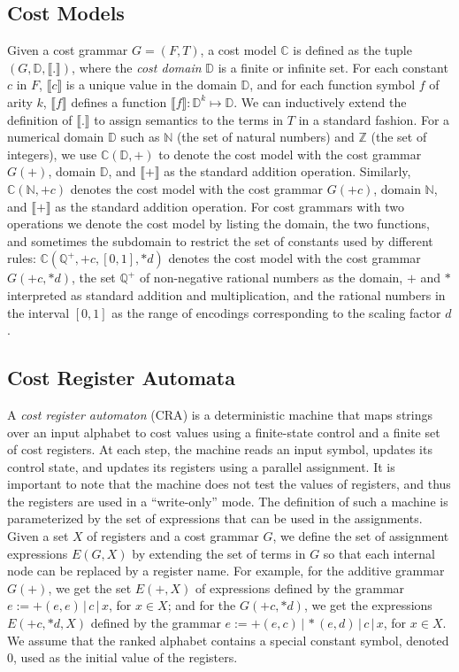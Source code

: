 \documentclass[11pt]{article}
\newcommand{\mypar}[1]{\subsection{#1}}
\newcommand{\domain}{\ensuremath{\mathbb{D}}}
\newcommand{\posrat}{\ensuremath{\mathbb{Q}^+}}
\newcommand{\Nat}{\ensuremath{\mathbb{N}}}
\newcommand{\vocab}{F}
\newcommand{\trees}{T}
\newcommand{\CG}{G}
\newcommand{\sep}{\ensuremath{\,|\,}}
\newcommand{\CostModel}{\ensuremath{\mathbb{C}}}
\newcommand{\interp}[1]{\ensuremath{\llbracket #1\rrbracket}}
\newcommand{\EDWA}{{CRA}\xspace}
\newcommand{\edwaexpr}[1]{\ensuremath{E(#1)}}
\begin{document}
\mypar{Cost Models}
Given a cost grammar $\CG = (\vocab, \trees)$, a cost model
$\CostModel$ is defined as the tuple $(\CG, \domain, \interp{.})$,
where the {\em cost domain\/} $\domain$ is a finite or infinite set.
For each constant $c$ in $\vocab$, $\interp{c}$ is a unique value in
the domain $\domain$, and for each function symbol $f$ of arity $k$,
$\interp{f}$ defines a function $\interp{f}:\domain^k \mapsto\domain$.
We can inductively extend the definition of $\interp{.}$ to assign
semantics to the terms in $\trees$ in a standard fashion.  For a
numerical domain $\domain$ such as $\Nat$ (the set of natural numbers)
and $\mathbb{Z}$ (the set of integers), we use $\CostModel(\domain,+)$
to denote the cost model with the cost grammar $\CG(+)$, domain
$\domain$, and $\interp{+}$ as the standard addition operation.
Similarly, $\CostModel(\Nat,+c)$ denotes the cost model with the cost
grammar $\CG(+c)$, domain $\Nat$, and $\interp{+}$ as the standard
addition operation.  For cost grammars with two operations we denote
the cost model by listing the domain, the two functions, and sometimes
the subdomain to restrict the set of constants used by different
rules: $\CostModel(\posrat,+c,[0,1],*d)$ denotes the cost model with
the cost grammar $\CG(+c,*d)$, the set $\mathbb{Q}^{+}$ of
non-negative rational numbers as the domain, $+$ and $*$ interpreted
as standard addition and multiplication, and the rational numbers in
the interval $[0,1]$ as the range of encodings corresponding to the
scaling factor $d$.

\mypar{Cost Register Automata}
A {\em cost register automaton} (\EDWA) is a deterministic machine
that maps strings over an input alphabet to cost values using a
finite-state control and a finite set of cost registers.  At each
step, the machine reads an input symbol, updates its control state,
and updates its registers using a parallel assignment.  It is
important to note that the machine does not test the values of
registers, and thus the registers are used in a ``write-only'' mode.
The definition of such a machine is parameterized by the set of
expressions that can be used in the assignments.  Given a set $X$ of
registers and a cost grammar $\CG$, we define the set of assignment
expressions $\edwaexpr{\CG,X}$ by extending the set of terms in $\CG$
so that each internal node can be replaced by a register name.  For
example, for the additive grammar $\CG(+)$, we get the set
$\edwaexpr{+,X}$ of expressions defined by the grammar $e :=
+(e,e)\sep c\sep x$, for $x\in X$; and for the $\CG(+c,*d)$, we get
the expressions $\edwaexpr{+c,*d,X}$ defined by the grammar $e :=
+(e,c)\sep *\!(e,d)\sep c\sep x$, for $x\in X$.  We assume that the
ranked alphabet contains a special constant symbol, denoted 0, used as
the initial value of the registers.
\end{document}
